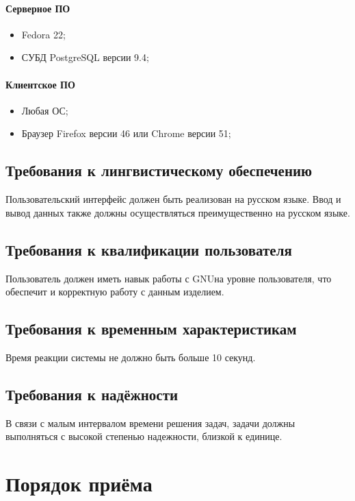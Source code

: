 \documentclass[russian,utf8,emptystyle]{eskdtext}
\begin{document}
\paragraph*{Серверное ПО} \hfill

\begin{itemize}
\item Fedora 22;
\item СУБД PostgreSQL версии 9.4;
\end{itemize}

\paragraph*{Клиентское ПО} \hfill

\begin{itemize}
\item Любая ОС;
\item Браузер Firefox версии 46 или Chrome версии 51;
\end{itemize}

\subsection{Требования к лингвистическому обеспечению}

Пользовательский интерфейс должен быть реализован на русском языке. Ввод и вывод данных также должны осуществляться преимущественно на русском языке.

\subsection{Требования к квалификации пользователя}

Пользователь должен иметь навык работы с GNU\Linux на уровне пользователя, что обеспечит и корректную работу с данным изделием.

\subsection{Требования к временным характеристикам}
Время реакции системы не должно быть больше 10 секунд.

\subsection{Требования к надёжности}
В связи с малым интервалом времени решения задач, задачи должны выполняться с высокой степенью надежности, близкой к единице.

\section{Порядок приёма}
\end{document}
